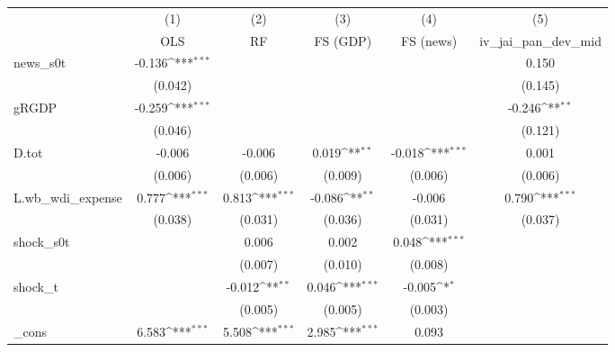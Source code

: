 {
\def\sym#1{\ifmmode^{#1}\else\(^{#1}\)\fi}
\begin{tabular}{l*{5}{c}}
\toprule
            &\multicolumn{1}{c}{(1)}&\multicolumn{1}{c}{(2)}&\multicolumn{1}{c}{(3)}&\multicolumn{1}{c}{(4)}&\multicolumn{1}{c}{(5)}\\
            &\multicolumn{1}{c}{OLS}&\multicolumn{1}{c}{RF}&\multicolumn{1}{c}{FS (GDP)}&\multicolumn{1}{c}{FS (news)}&\multicolumn{1}{c}{iv\_jai\_pan\_dev\_mid}\\
\midrule
news\_s0t    &      -0.136\sym{***}&                     &                     &                     &       0.150         \\
            &     (0.042)         &                     &                     &                     &     (0.145)         \\
\addlinespace
gRGDP       &      -0.259\sym{***}&                     &                     &                     &      -0.246\sym{**} \\
            &     (0.046)         &                     &                     &                     &     (0.121)         \\
\addlinespace
D.tot       &      -0.006         &      -0.006         &       0.019\sym{**} &      -0.018\sym{***}&       0.001         \\
            &     (0.006)         &     (0.006)         &     (0.009)         &     (0.006)         &     (0.006)         \\
\addlinespace
L.wb\_wdi\_expense&       0.777\sym{***}&       0.813\sym{***}&      -0.086\sym{**} &      -0.006         &       0.790\sym{***}\\
            &     (0.038)         &     (0.031)         &     (0.036)         &     (0.031)         &     (0.037)         \\
\addlinespace
shock\_s0t   &                     &       0.006         &       0.002         &       0.048\sym{***}&                     \\
            &                     &     (0.007)         &     (0.010)         &     (0.008)         &                     \\
\addlinespace
shock\_t     &                     &      -0.012\sym{**} &       0.046\sym{***}&      -0.005\sym{*}  &                     \\
            &                     &     (0.005)         &     (0.005)         &     (0.003)         &                     \\
\addlinespace
\_cons      &       6.583\sym{***}&       5.508\sym{***}&       2.985\sym{***}&       0.093         &                     \\

\end{tabular}}
